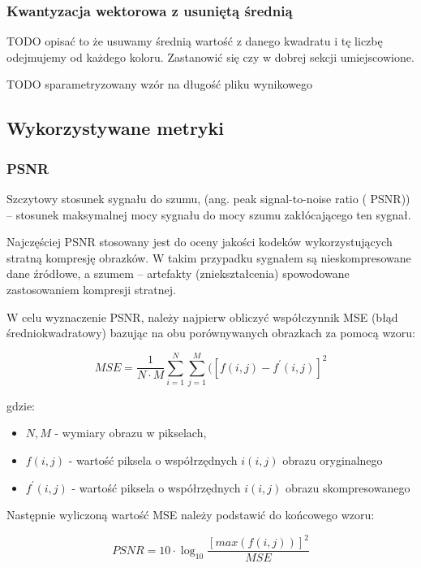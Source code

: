 \documentclass{article}
\begin{document}
\subsubsection{Kwantyzacja wektorowa z usuniętą średnią}

TODO opisać to że usuwamy średnią wartość z danego kwadratu i tę liczbę odejmujemy od każdego koloru. Zastanowić się czy w dobrej sekcji umiejscowione.

TODO sparametryzowany wzór na długość pliku wynikowego

\subsection{Wykorzystywane metryki}

\subsubsection{PSNR}

Szczytowy stosunek sygnału do szumu, (ang. peak signal-to-noise ratio ( PSNR)) – stosunek maksymalnej mocy sygnału do mocy szumu zakłócającego ten sygnał.  

Najczęściej PSNR stosowany jest do oceny jakości kodeków wykorzystujących stratną kompresję obrazków. W takim przypadku sygnałem są nieskompresowane dane źródłowe, a szumem – artefakty (zniekształcenia) spowodowane zastosowaniem kompresji stratnej. 

W celu wyznaczenie PSNR, należy najpierw obliczyć współczynnik MSE (błąd średniokwadratowy) bazując na obu porównywanych obrazkach za pomocą wzoru:

\begin{equation}
MSE = \frac{1}{N \cdot M} \sum_{i=1}^N \sum_{j=1}^M ([f(i, j) - f^{'}(i, j)]^2
\end{equation}

gdzie:
\begin{itemize}[label=]
    \item $N, M$ - wymiary obrazu w pikselach,
    \item $f(i, j)$ - wartość piksela o współrzędnych $i(i, j)$ obrazu oryginalnego
    \item $f^{'}(i, j)$ - wartość piksela o współrzędnych $i(i, j)$ obrazu skompresowanego
\end{itemize}

Następnie wyliczoną wartość MSE należy podstawić do końcowego wzoru: 

\begin{equation}
PSNR = 10 \cdot \log_10 \frac{[max(f(i,j))]^2}{MSE}
\end{equation}
\end{document}
